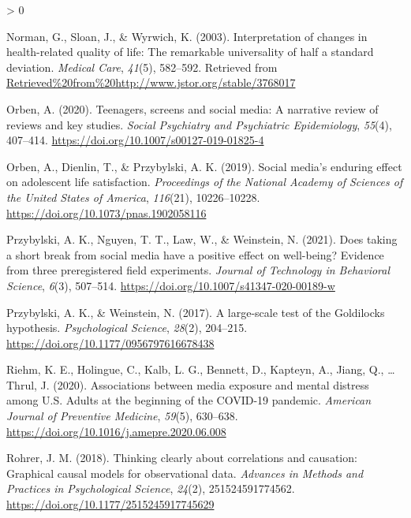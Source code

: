 \documentclass[
  english,
  man,mask,floatsintext]{apa6}
\newlength{\cslhangindent}
\newenvironment{CSLReferences}[2] %
 {%
  \setlength{\parindent}{0pt}
  \ifodd #1 \everypar{\setlength{\hangindent}{\cslhangindent}}\ignorespaces\fi
  \ifnum #2 > 0
  \setlength{\parskip}{#2\baselineskip}
  \fi
 }%
 {}
\begin{document}
\begin{CSLReferences}{1}{0}
\leavevmode\hypertarget{ref-normanInterpretationChangesHealthrelated2003}{}%
Norman, G., Sloan, J., \& Wyrwich, K. (2003). Interpretation of changes in health-related quality of life: {The} remarkable universality of half a standard deviation. \emph{Medical Care}, \emph{41}(5), 582--592. Retrieved from \url{Retrieved\%20from\%20http://www.jstor.org/stable/3768017}

\leavevmode\hypertarget{ref-orbenTeenagersScreensSocial2020}{}%
Orben, A. (2020). Teenagers, screens and social media: A narrative review of reviews and key studies. \emph{Social Psychiatry and Psychiatric Epidemiology}, \emph{55}(4), 407--414. \url{https://doi.org/10.1007/s00127-019-01825-4}

\leavevmode\hypertarget{ref-orbenSocialMediaEnduring2019}{}%
Orben, A., Dienlin, T., \& Przybylski, A. K. (2019). Social media's enduring effect on adolescent life satisfaction. \emph{Proceedings of the National Academy of Sciences of the United States of America}, \emph{116}(21), 10226--10228. \url{https://doi.org/10.1073/pnas.1902058116}

\leavevmode\hypertarget{ref-przybylskiDoesTakingShort2021a}{}%
Przybylski, A. K., Nguyen, T. T., Law, W., \& Weinstein, N. (2021). Does taking a short break from social media have a positive effect on well-being? {Evidence} from three preregistered field experiments. \emph{Journal of Technology in Behavioral Science}, \emph{6}(3), 507--514. \url{https://doi.org/10.1007/s41347-020-00189-w}

\leavevmode\hypertarget{ref-przybylskiLargescaleTestGoldilocks2017}{}%
Przybylski, A. K., \& Weinstein, N. (2017). A large-scale test of the {Goldilocks} hypothesis. \emph{Psychological Science}, \emph{28}(2), 204--215. \url{https://doi.org/10.1177/0956797616678438}

\leavevmode\hypertarget{ref-riehmAssociationsMediaExposure2020}{}%
Riehm, K. E., Holingue, C., Kalb, L. G., Bennett, D., Kapteyn, A., Jiang, Q., \ldots{} Thrul, J. (2020). Associations between media exposure and mental distress among {U}.{S}. Adults at the beginning of the {COVID}-19 pandemic. \emph{American Journal of Preventive Medicine}, \emph{59}(5), 630--638. \url{https://doi.org/10.1016/j.amepre.2020.06.008}

\leavevmode\hypertarget{ref-rohrerThinkingClearlyCorrelations2018}{}%
Rohrer, J. M. (2018). Thinking clearly about correlations and causation: {Graphical} causal models for observational data. \emph{Advances in Methods and Practices in Psychological Science}, \emph{24}(2), 251524591774562. \url{https://doi.org/10.1177/2515245917745629}


\end{CSLReferences}
\end{document}
